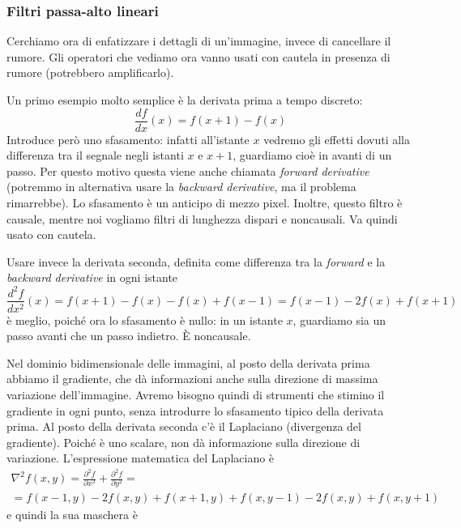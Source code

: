 \documentclass[a4paper,11pt]{article}
\begin{document}
\subsubsection{Filtri passa-alto lineari}
Cerchiamo ora di enfatizzare i dettagli di un'immagine, invece di cancellare il rumore. Gli operatori che vediamo ora vanno usati con
cautela in presenza di rumore (potrebbero amplificarlo).
\par
Un primo esempio molto semplice è la derivata prima a tempo discreto:
\[ \frac{df}{dx}(x) = f(x+1) - f(x) \]
Introduce però uno sfasamento: infatti all'istante $x$ vedremo gli effetti dovuti alla differenza tra il segnale negli istanti $x$ e $x+1$, guardiamo cioè
in avanti di un passo. Per questo motivo questa viene anche chiamata \textit{forward derivative} (potremmo in alternativa usare la
\textit{backward derivative}, ma il problema rimarrebbe). Lo sfasamento è un anticipo di mezzo pixel. Inoltre, questo filtro è causale, mentre noi vogliamo
filtri di lunghezza dispari e noncausali. Va quindi usato con cautela.
\par
Usare invece la derivata seconda, definita come differenza tra la \textit{forward} e la \textit{backward derivative} in ogni istante
\[ \frac{d^2 f}{dx^2}(x) = f(x+1) - f(x) - f(x) + f(x-1) = f(x-1) - 2f(x) + f(x+1) \]
è meglio, poiché ora lo sfasamento è nullo: in un istante $x$, guardiamo sia un passo avanti che un passo indietro. È noncausale.
\par
Nel dominio bidimensionale delle immagini, al posto della derivata prima abbiamo il gradiente, che dà informazioni anche sulla direzione di massima
variazione dell'immagine. Avremo bisogno quindi di strumenti che stimino il gradiente in ogni punto, senza introdurre lo sfasamento tipico della derivata
prima. Al posto della derivata seconda c'è il Laplaciano (divergenza del gradiente). Poiché è uno scalare, non dà informazione sulla direzione di variazione.
L'espressione matematica del Laplaciano è
\begin{gather*}
   \nabla^2 f(x,y) = \frac{\partial^2 f}{\partial x^2} + \frac{\partial^2 f}{\partial y^2} = \\
   = f(x-1,y) - 2f(x,y) + f(x+1,y) + f(x,y-1) - 2f(x,y)
+ f(x,y+1)
\end{gather*}
e quindi la sua maschera è
\newline
\begin{center}
\end{center}
\end{document}
